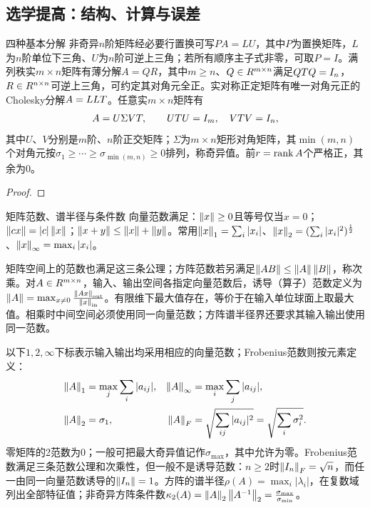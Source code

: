 \subsection{选学提高：结构、计算与误差}
\begin{theorem}{四种基本分解}
非奇异$n$阶矩阵经必要行置换可写$PA=LU$，其中$P$为置换矩阵，$L$为$n$阶单位下三角、$U$为$n$阶可逆上三角；若所有顺序主子式非零，可取$P=I$。满列秩实$m\times n$矩阵有薄分解$A=QR$，其中$m\ge n$、$Q\in R^{m\times n}$满足$QT Q=I_n$，$R\in R^{n\times n}$可逆上三角，可约定其对角元全正。实对称正定矩阵有唯一对角元正的Cholesky分解$A=LLT$。任意实$m\times n$矩阵有
\begin{equation}A=U\Sigma VT,\qquad UT U=I_m,\quad VT V=I_n,\label{eq:svd}\end{equation}
其中$U$、$V$分别是$m$阶、$n$阶正交矩阵；$\Sigma$为$m\times n$矩形对角矩阵，其$\min(m,n)$个对角元按$\sigma_1\ge\cdots\ge\sigma_{\min(m,n)}\ge0$排列，称奇异值。前$r=\operatorname{rank} A$个严格正，其余为0。
\end{theorem}
\begin{proof}

\end{proof}
\begin{definition}{矩阵范数、谱半径与条件数}
向量范数满足：$\left\lVert x\right\rVert\ge0$且等号仅当$x=0$；$\left\lVert cx\right\rVert=|c|\left\lVert x\right\rVert$；$\left\lVert x+y\right\rVert\le\left\lVert x\right\rVert+\left\lVert y\right\rVert$。常用$\left\lVert x\right\rVert_1=\sum_i|x_i|$、$\left\lVert x\right\rVert_2=(\sum_i|x_i|^2)^{\frac{1}{2}}$、$\left\lVert x\right\rVert_\infty=\max_i|x_i|$。

矩阵空间上的范数也满足这三条公理；方阵范数若另满足$\left\lVert AB\right\rVert\le\left\lVert A\right\rVert\left\lVert B\right\rVert$，称次乘。对$A\in R^{m\times n}$，输入、输出空间各指定向量范数后，诱导（算子）范数定义为$\left\lVert A\right\rVert=\max_{x\ne0}\frac{\left\lVert Ax\right\rVert_{\rm out}}{\left\lVert x\right\rVert_{\rm in}}$。有限维下最大值存在，等价于在输入单位球面上取最大值。相乘时中间空间必须使用同一向量范数；方阵谱半径界还要求其输入输出使用同一范数。

以下$1,2,\infty$下标表示输入输出均采用相应的向量范数；Frobenius范数则按元素定义：
\begin{equation}\begin{aligned}
\left\lVert A\right\rVert_1&=\max_j\sum_i|a_{ij}|,&\left\lVert A\right\rVert_\infty&=\max_i\sum_j|a_{ij}|,\\
\left\lVert A\right\rVert_2&=\sigma_1,&\left\lVert A\right\rVert_F&=\sqrt{\sum_{ij}|a_{ij}|^2}=\sqrt{\sum_i\sigma_i^2}.
\end{aligned}\end{equation}
零矩阵的2范数为0；一般可把最大奇异值记作$\sigma_{\max}$，其中允许为零。Frobenius范数满足三条范数公理和次乘性，但一般不是诱导范数：$n\ge2$时$\left\lVert I_n\right\rVert_F=\sqrt n$，而任一由同一向量范数诱导的$\left\lVert I_n\right\rVert=1$。方阵的谱半径$\rho(A)=\max_i|\lambda_i|$，在复数域列出全部特征值；非奇异方阵条件数$\kappa_2(A)=\left\lVert A\right\rVert_2\left\lVert A^{-1}\right\rVert_2=\frac{\sigma_{\max}}{\sigma_{\min}}$。
\end{definition}
